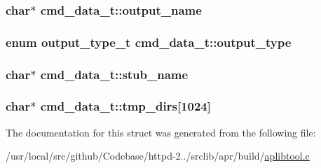 \subsubsection[{\texorpdfstring{output\+\_\+name}{output_name}}]{\setlength{\rightskip}{0pt plus 5cm}char$\ast$ cmd\+\_\+data\+\_\+t\+::output\+\_\+name}\hypertarget{structcmd__data__t_aa23bfff67d2821006b4c482b7a064849}{}\label{structcmd__data__t_aa23bfff67d2821006b4c482b7a064849}
\subsubsection[{\texorpdfstring{output\+\_\+type}{output_type}}]{\setlength{\rightskip}{0pt plus 5cm}enum {\bf output\+\_\+type\+\_\+t} cmd\+\_\+data\+\_\+t\+::output\+\_\+type}\hypertarget{structcmd__data__t_a4f474cb12752328c4420cc09f6f3cb34}{}\label{structcmd__data__t_a4f474cb12752328c4420cc09f6f3cb34}
\subsubsection[{\texorpdfstring{stub\+\_\+name}{stub_name}}]{\setlength{\rightskip}{0pt plus 5cm}char$\ast$ cmd\+\_\+data\+\_\+t\+::stub\+\_\+name}\hypertarget{structcmd__data__t_a27cb7d32c58e4dc2d3757a2746fc2036}{}\label{structcmd__data__t_a27cb7d32c58e4dc2d3757a2746fc2036}
\subsubsection[{\texorpdfstring{tmp\+\_\+dirs}{tmp_dirs}}]{\setlength{\rightskip}{0pt plus 5cm}char$\ast$ cmd\+\_\+data\+\_\+t\+::tmp\+\_\+dirs\mbox{[}1024\mbox{]}}\hypertarget{structcmd__data__t_a3aced54205af8c44cc4d2f2b244a5c52}{}\label{structcmd__data__t_a3aced54205af8c44cc4d2f2b244a5c52}


The documentation for this struct was generated from the following file\+:\begin{DoxyCompactItemize}
\item 
/usr/local/src/github/\+Codebase/httpd-\/2../srclib/apr/build/\hyperlink{aplibtool_8c}{aplibtool.\+c}\end{DoxyCompactItemize}
